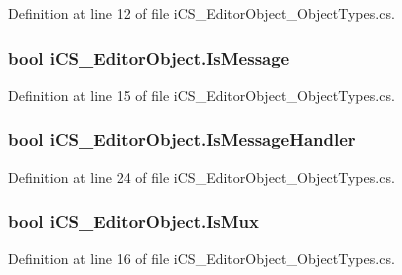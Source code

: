 Definition at line 12 of file i\+C\+S\+\_\+\+Editor\+Object\+\_\+\+Object\+Types.\+cs.

\hypertarget{classi_c_s___editor_object_a159f9bde587747899b4dd03d01cb3ce3}{
\subsubsection[{Is\+Message}]{\setlength{\rightskip}{0pt plus 5cm}bool i\+C\+S\+\_\+\+Editor\+Object.\+Is\+Message\hspace{0.3cm}{\ttfamily [get]}}}\label{classi_c_s___editor_object_a159f9bde587747899b4dd03d01cb3ce3}


Definition at line 15 of file i\+C\+S\+\_\+\+Editor\+Object\+\_\+\+Object\+Types.\+cs.

\hypertarget{classi_c_s___editor_object_af160fe955f4f37cf64923de50d1947fa}{
\subsubsection[{Is\+Message\+Handler}]{\setlength{\rightskip}{0pt plus 5cm}bool i\+C\+S\+\_\+\+Editor\+Object.\+Is\+Message\+Handler\hspace{0.3cm}{\ttfamily [get]}}}\label{classi_c_s___editor_object_af160fe955f4f37cf64923de50d1947fa}


Definition at line 24 of file i\+C\+S\+\_\+\+Editor\+Object\+\_\+\+Object\+Types.\+cs.

\hypertarget{classi_c_s___editor_object_a9b7d10652d5518309c097933e561e5f9}{
\subsubsection[{Is\+Mux}]{\setlength{\rightskip}{0pt plus 5cm}bool i\+C\+S\+\_\+\+Editor\+Object.\+Is\+Mux\hspace{0.3cm}{\ttfamily [get]}}}\label{classi_c_s___editor_object_a9b7d10652d5518309c097933e561e5f9}


Definition at line 16 of file i\+C\+S\+\_\+\+Editor\+Object\+\_\+\+Object\+Types.\+cs.

